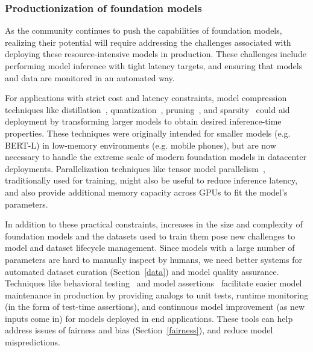 \subsubsection{Productionization of foundation models}

As the community continues to push the capabilities of foundation models, realizing their potential will require addressing the challenges associated with deploying these resource-intensive models in production. These challenges include performing model inference with tight latency targets, and ensuring that models and data are monitored in an automated way.

For applications with strict cost and latency constraints, model compression techniques like distillation~\citep{hinton2015distilling, li2020train, sanh2019distilbert}, quantization~\citep{polino2018model, gholami2021survey, zhou2018adaptive}, pruning~\citep{lecun1990optimal, gordon2020compressing, mccarley2019structured, wang2019structured, sajjad2020effect}, and sparsity~\citep{gale2020sparse, Elsen_2020_CVPR} could aid deployment by transforming larger models to obtain desired inference-time properties. These techniques were originally intended for smaller models (e.g. BERT-L) in low-memory environments (e.g. mobile phones), but are now necessary to handle the extreme scale of modern foundation models in datacenter deployments. Parallelization techniques like tensor model parallelism~\citep{shoeybi2019megatronlm}, traditionally used for training, might also be useful to reduce inference latency, and also provide additional memory capacity across GPUs to fit the model's parameters.

In addition to these practical constraints, increases in the size and complexity of foundation models and the datasets used to train them pose new challenges to model and dataset lifecycle management. Since models with a large number of parameters are hard to manually inspect by humans, we need better systems for automated dataset curation (Section~\ref{data}) and model quality assurance. Techniques like behavioral testing~\citep{ribeiro2020beyond} and model assertions~\citep{kang2020model} facilitate easier model maintenance in production by providing analogs to unit tests, runtime monitoring (in the form of test-time assertions), and continuous model improvement (as new inputs come in) for models deployed in end applications. These tools can help address issues of fairness and bias (Section~\ref{fairness}), and reduce model mispredictions.

\newsection
